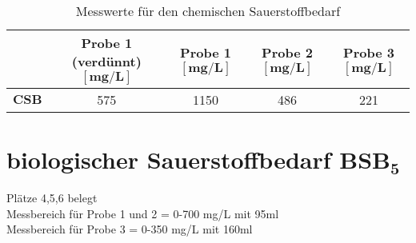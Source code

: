 \vspace*{-2.5mm}
\renewcommand{\arraystretch}{1.2}
\begin{table}[h!]
	\centering
	\caption{Messwerte für den chemischen Sauerstoffbedarf}
	\label{tab:csb}
	\begin{tabulary}{1.7\textwidth}{L|CC|C|C}
		\hline
		& \textbf{Probe 1 (verdünnt) $\boldsymbol{\left[\si{\milli \gram \per \liter}\right]}$}  &\textbf{Probe 1 $\boldsymbol{\left[\si{\milli \gram \per \liter}\right]}$}& \textbf{Probe 2 $\boldsymbol{\left[\si{\milli \gram \per \liter}\right]}$} & \textbf{Probe 3 $\boldsymbol{\left[\si{\milli \gram \per \liter}\right]}$}  \\ 
		\hline
		\textbf{$\boldsymbol{CSB}$}& 575 & 1150 & 486 & 221 \\
		\hline
	\end{tabulary}
\end{table}
\FloatBarrier
\vspace*{-2.5mm}

\section[biologischer Sauerstoffbedarf BSB$_5$]{biologischer Sauerstoffbedarf BSB$\boldsymbol{_5}$}
Plätze 4,5,6 belegt\\
Messbereich für Probe 1 und 2 = 0-700 mg/L mit 95ml\\
Messbereich für Probe 3 = 0-350 mg/L mit 160ml


\newpage

